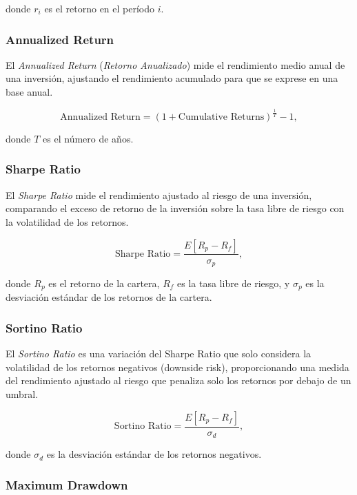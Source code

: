 \documentclass[a4paper,12pt, twoside]{report}
\begin{document}
donde $r_i$ es el retorno en el período $i$.

\subsubsection{Annualized Return}

El \textit{Annualized Return} (\textit{Retorno Anualizado}) mide el rendimiento medio anual de una inversión, ajustando el rendimiento acumulado para que se exprese en una base anual.

\begin{equation}
\text{Annualized Return} = \left(1 + \text{Cumulative Returns}\right)^{\frac{1}{T}} - 1,
\end{equation}

donde $T$ es el número de años.

\subsubsection{Sharpe Ratio}

El \textit{Sharpe Ratio} mide el rendimiento ajustado al riesgo de una inversión, comparando el exceso de retorno de la inversión sobre la tasa libre de riesgo con la volatilidad de los retornos.

\begin{equation}
\text{Sharpe Ratio} = \frac{E[R_p - R_f]}{\sigma_p},
\end{equation}

donde $R_p$ es el retorno de la cartera, $R_f$ es la tasa libre de riesgo, y $\sigma_p$ es la desviación estándar de los retornos de la cartera.

\subsubsection{Sortino Ratio}

El \textit{Sortino Ratio} es una variación del Sharpe Ratio que solo considera la volatilidad de los retornos negativos (downside risk), proporcionando una medida del rendimiento ajustado al riesgo que penaliza solo los retornos por debajo de un umbral.

\begin{equation}
\text{Sortino Ratio} = \frac{E[R_p - R_f]}{\sigma_{d}},
\end{equation}

donde $\sigma_{d}$ es la desviación estándar de los retornos negativos.

\subsubsection{Maximum Drawdown}
\end{document}
